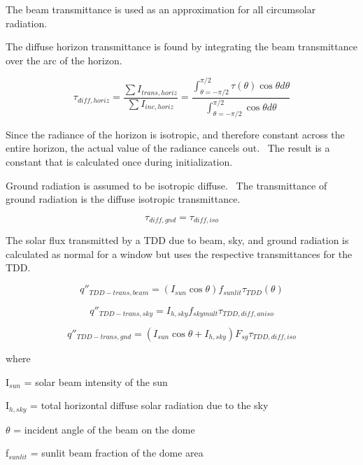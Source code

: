 The beam transmittance is used as an approximation for all circumsolar radiation.

The diffuse horizon transmittance is found by integrating the beam transmittance over the arc of the horizon.

\begin{equation}
{\tau_{diff,horiz}} = \frac{{\sum {{I_{trans,horiz}}} }}{{\sum {{I_{inc,horiz}}} }} = \frac{{\int_{\theta  =  - \pi /2}^{\pi /2} {\tau (\theta )\cos \theta d\theta } }}{{\int_{\theta  =  - \pi /2}^{\pi /2} {\cos \theta d\theta } }}
\end{equation}

Since the radiance of the horizon is isotropic, and therefore constant across the entire horizon, the actual value of the radiance cancels out.~ The result is a constant that is calculated once during initialization.

Ground radiation is assumed to be isotropic diffuse.~ The transmittance of ground radiation is the diffuse isotropic transmittance.

\begin{equation}
{\tau_{diff,gnd}} = {\tau_{diff,iso}}
\end{equation}

The solar flux transmitted by a TDD due to beam, sky, and ground radiation is calculated as normal for a window but uses the respective transmittances for the TDD.

\begin{equation}
{q''_{TDD - trans,beam}} = \left( {{I_{sun}}\cos \theta } \right){f_{sunlit}}{\tau_{TDD}}(\theta )
\end{equation}

\begin{equation}
{q''_{TDD - trans,sky}} = {I_{h,sky}}{f_{skymult}}{\tau_{TDD,diff,aniso}}
\end{equation}

\begin{equation}
{q''_{TDD - trans,gnd}} = \left( {{I_{sun}}\cos \theta  + {I_{h,sky}}} \right){F_{sg}}{\tau_{TDD,diff,iso}}
\end{equation}

where

I\(_{sun}\) = solar beam intensity of the sun

I\(_{h,sky}\) = total horizontal diffuse solar radiation due to the sky

\(\theta\) = incident angle of the beam on the dome

f\(_{sunlit}\) = sunlit beam fraction of the dome area

